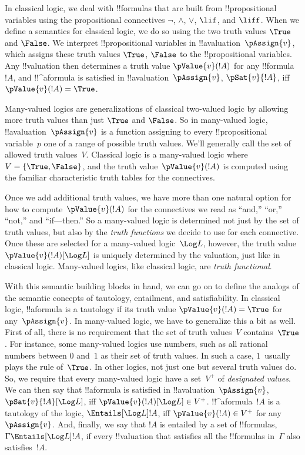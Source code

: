 \documentclass[../../../include/open-logic-section]{subfiles}
\begin{document}

In classical logic, we deal  with !!{formula}s that are built from
!!{propositional variable}s using the propositional connectives
$\lnot$, $\land$, $\lor$, $\lif$, and $\liff$.  When we define a
semantics for classical logic, we do so using the two truth values
$\True$ and $\False$.  We interpret !!{propositional variable}s in
!!a{valuation}~$\pAssign{v}$, which assigns these truth values
$\True$, $\False$ to the !!{propositional variable}s. Any
!!{valuation} then determines a truth value $\pValue{v}(!A)$ for any
!!{formula}~$!A$, and !!^a{formula} is satisfied in
!!a{valuation}~$\pAssign{v}$, $\pSat{v}{!A}$, iff $\pValue{v}(!A) =
\True$.

Many-valued logics are generalizations of classical two-valued logic
by allowing more truth values than just $\True$ and $\False$. So in
many-valued logic, !!a{valuation}~$\pAssign{v}$ is a function
assigning to every !!{propositional variable}~$p$ one of a range of
possible truth values.  We'll generally call the set of allowed truth
values~$V$.  Classical logic is a many-valued logic where $V =
\{\True, \False\}$, and the truth value~$\pValue{v}(!A)$ is computed
using the familiar characteristic truth tables for the connectives.

Once we add additional truth values, we have more than one natural
option for how to compute~$\pValue{v}(!A)$ for the connectives we read
as ``and,'' ``or,'' ``not,'' and ``if---then.''  So a many-valued
logic is determined not just by the set of truth values, but also by
the \emph{truth functions} we decide to use for each connective.  Once
these are selected for a many-valued logic~$\Log L$, however, the
truth value $\pValue{v}(!A)[\Log L]$ is uniquely determined by the
valuation, just like in classical logic. Many-valued logics, like
classical logic, are \emph{truth functional}.

With this semantic building blocks in hand, we can go on to define the
analogs of the semantic concepts of tautology, entailment, and
satisfiability.  In classical logic, !!a{formula} is a tautology if
its truth value $\pValue{v}(!A) = \True$ for any~$\pAssign{v}$.  In
many-valued logic, we have to generalize this a bit as well. First of
all, there is no requirement that the set of truth values~$V$
contains~$\True$. For instance, some many-valued logics use numbers,
such as all rational numbers between $0$ and~$1$ as their set of truth
values.  In such a case, $1$~usually plays the rule of~$\True$. In
other logics, not just one but several truth values do.  So, we
require that every many-valued logic have a set~$V^+$ of
\emph{designated values}.  We can then say that !!a{formula} is
satisfied in !!a{valuation}~$\pAssign{v}$, $\pSat{v}{!A}[\Log L]$, iff
$\pValue{v}(!A)[\Log L] \in V^+$. !!^a{formula}~$!A$ is a tautology of the
logic, $\Entails[\Log L] !A$, iff $\pValue{v}(!A) \in V^+$ for
any~$\pAssign{v}$. And, finally, we say that $!A$ is entailed by a set
of !!{formula}s, $\Gamma \Entails[\Log L] !A$, if every !!{valuation} that
satisfies all the !!{formula}s in~$\Gamma$ also satisfies~$!A$.
\end{document}
